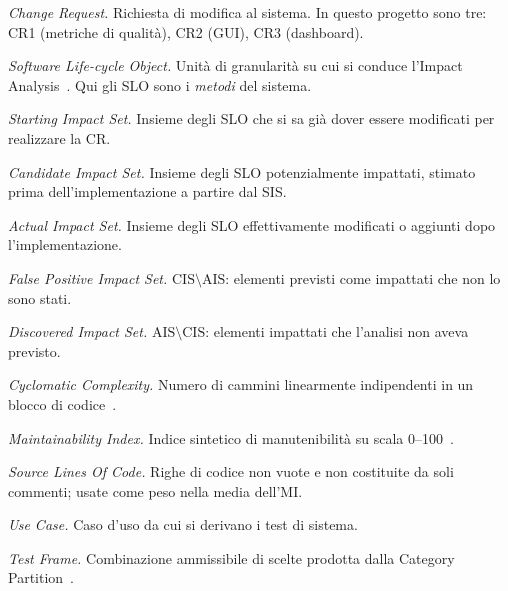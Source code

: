 \documentclass[11pt,a4paper]{article}
\newcommand{\CIS}{\textrm{CIS}}
\newcommand{\AIS}{\textrm{AIS}}
\begin{document}
\begin{description}[style=nextline,leftmargin=2.6cm,labelwidth=2.2cm,
                    font=\normalfont\bfseries]

  \item[CR] \emph{Change Request.} Richiesta di modifica al sistema. In questo
    progetto sono tre: CR1 (metriche di qualit\`a), CR2 (GUI), CR3 (dashboard).

  \item[SLO] \emph{Software Life-cycle Object.} Unit\`a di granularit\`a su cui
    si conduce l'Impact Analysis~\cite{tripathynaik}. Qui gli SLO sono i
    \emph{metodi} del sistema.

  \item[SIS] \emph{Starting Impact Set.} Insieme degli SLO che si sa gi\`a
    dover essere modificati per realizzare la CR.

  \item[CIS] \emph{Candidate Impact Set.} Insieme degli SLO potenzialmente
    impattati, stimato prima dell'implementazione a partire dal SIS.

  \item[AIS] \emph{Actual Impact Set.} Insieme degli SLO effettivamente
    modificati o aggiunti dopo l'implementazione.

  \item[FPIS] \emph{False Positive Impact Set.} $\CIS \setminus \AIS$: elementi
    previsti come impattati che non lo sono stati.

  \item[DIS] \emph{Discovered Impact Set.} $\AIS \setminus \CIS$: elementi
    impattati che l'analisi non aveva previsto.

  \item[CC] \emph{Cyclomatic Complexity.} Numero di cammini linearmente
    indipendenti in un blocco di codice~\cite{mccabe}.

  \item[MI] \emph{Maintainability Index.} Indice sintetico di manutenibilit\`a
    su scala 0--100~\cite{colemanoman}.

  \item[SLOC] \emph{Source Lines Of Code.} Righe di codice non vuote e non
    costituite da soli commenti; usate come peso nella media dell'MI.

  \item[UC] \emph{Use Case.} Caso d'uso da cui si derivano i test di sistema.

  \item[TF] \emph{Test Frame.} Combinazione ammissibile di scelte prodotta dalla
    Category Partition~\cite{ostrandbalcer}.


\end{description}
\end{document}
